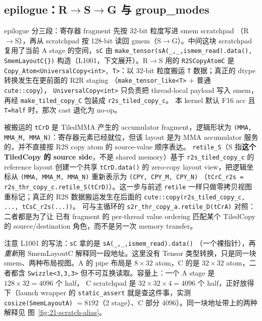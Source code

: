 \subsection{epilogue：R$\to$S$\to$G 与 group\_modes}

epilogue 分三段：寄存器 fragment 先按 32-bit 粒度写进 smem scratchpad
（R$\to$S），再从 scratchpad 按 128-bit 读回 gmem（S$\to$G）。中间这块
scratchpad 复用了当前 A stage 的空间，\texttt{sC}
由 \texttt{make\_\allowbreak{}tensor\allowbreak{}(sA(\_,\allowbreak{}\_,\allowbreak{}ismem\_\allowbreak{}read).\allowbreak{}data\allowbreak{}(),\allowbreak{} SmemLayoutC\{\})}
构造（L1001，下文展开）。R$\to$S 用的 \texttt{R2SCopyAtomC} 是
\texttt{Copy\_Atom<UniversalCopy<int>,\allowbreak{} T>}：以 32-bit 粒度搬运
\texttt{T} 数据；真正的 dtype 转换发生在更前面的 R2R staging
（\texttt{make\_tensor\_like<T>} + 普通 \texttt{cute::copy}），
\texttt{UniversalCopy<int>} 只负责把 thread-local payload 写入 smem，
再经 \texttt{make\_tiled\_copy\_C} 包装成 \texttt{r2s\_tiled\_copy\_c}。
本 kernel 默认 F16 acc 且 \texttt{T=half} 时，那次 cast 退化为 no-op。

\begin{sloppypar}
被搬运的 \texttt{tCrD} 是 TiledMMA 产生的 accumulator fragment，逻辑形状为
\texttt{(MMA, MMA\_M, MMA\_N)}：寄存器元素已经就位，但该 layout 是为 MMA
accumulator 服务的，并不直接按 R2S copy atom 的 source-value 顺序表达。
\texttt{retile\_S}（S 指\textbf{这个 TiledCopy 的 source side}，不是 shared
memory）基于 \texttt{r2s\_tiled\_copy\_c} 的 reference layout 创建一个共享
\texttt{tCrD.data()} 的 zero-copy layout view，把逻辑坐标从
\texttt{(MMA, MMA\_M, MMA\_N)} 重新表示为 \texttt{(CPY, CPY\_M, CPY\_N)}
（\texttt{tCrC\_r2s = r2s\_thr\_copy\_c.retile\_S(tCrD)}）。这一步与前述
\texttt{retile} 一样只做零拷贝视图重标记；真正的
R2S 数据搬运发生在后面的
\texttt{cute::copy(r2s\_tiled\_copy\_c, ...,\allowbreak{} tCsC\_r2s(...))}。
可与主循环的 \texttt{s2r\_thr\_copy\_a.retile\_D(tCrA)} 对照：二者都是为了让
已有 fragment 的 per-thread value ordering 匹配某个 TiledCopy 的
source/destination 角色，而不是另一次 memory transfer。
\end{sloppypar}

\begin{sloppypar}
注意 L1001 的写法：\texttt{sC} 拿的是 \texttt{s\allowbreak{}A\allowbreak{}(\_\allowbreak{},\allowbreak{}\_\allowbreak{},\allowbreak{}ismem\_\allowbreak{}read).\allowbreak{}data\allowbreak{}()}
（一个裸指针），再\emph{重新}用 SmemLayoutC 解释同一段地址。这里没有 Tensor
类型转换，只是同一块 smem、两种布局视图。A 的 pipe 布局是
$8\times32$ atom，C 的是 $32\times32$ atom，二者都含 \texttt{Swizzle\allowbreak{}<3,\allowbreak{}3,\allowbreak{}3>}
但不可互换读取。容量上：一个 A stage 是 $128\times32=4096$ 个 half，
C scratchpad 是 $32\times32\times4=4096$ 个 half，正好放得下（launch wrapper
的 \texttt{static\_\allowbreak{}assert} 就是查这件事，实测 \texttt{cosize\allowbreak{}(Smem\allowbreak{}Layout\allowbreak{}A)}
$=8192$（2 stage）、C 部分 $4096$）。同一块地址带上的两种解释见
图~\ref{fig:21-scratch-alias}。
\end{sloppypar}

